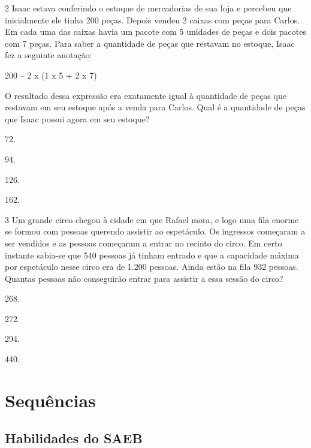 \num{2} Isaac estava conferindo o estoque de mercadorias de sua loja e percebeu
que inicialmente ele tinha 200 peças. Depois vendeu 2 caixas com peças
para Carlos. Em cada uma das caixas havia um pacote com 5 unidades de peças e dois
pacotes com 7 peças. Para saber a quantidade de peças que restavam no estoque, Isaac fez a
seguinte anotação:

\begin{myquote}
200 -- 2 x (1 x 5 + 2 x 7)
\end{myquote}

O resultado dessa expressão era exatamente igual à quantidade de peças
que restavam em seu estoque após a venda para Carlos. Qual é a
quantidade de peças que Isaac possui agora em seu estoque?

\begin{multicols}{2}
\begin{escolha}
\item
  72.
\item
  94.
\item
  126.
\item
  162.
\end{escolha}
\end{multicols}


\num{3} Um grande circo chegou à cidade em que Rafael mora, e logo uma fila
enorme se formou com pessoas querendo assistir ao espetáculo. Os
ingressos começaram a ser vendidos e as pessoas começaram a entrar no
recinto do circo. Em certo instante sabia-se que 540 pessoas já tinham
entrado e que a capacidade máxima por espetáculo nesse circo era de 1.200 pessoas. Ainda estão na fila 932 pessoas. Quantas pessoas não
conseguirão entrar para assistir a essa sessão do circo?

\begin{multicols}{2}
\begin{escolha}
\item
  268.
\item
  272.
\item
  294.
\item
  440.
\end{escolha}
\end{multicols}


\chapter{Sequências}

\section{Habilidades do SAEB}

